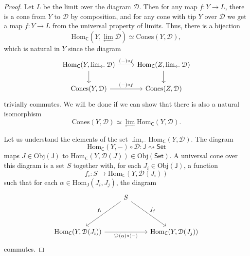 \documentclass[a4paper,10pt]{scrreprt}
\newcommand{\Obj}{\mathrm{Obj}}
\newcommand{\Hom}{\mathrm{Hom}}
\theoremstyle{definition}
\theoremstyle{plain}
\theoremstyle{remark}
\begin{document}
\begin{proof}
  Let $L$ be the limit over the diagram $\mathcal{D}$. Then for any map $f\colon Y \to L$, there is a cone from $Y$ to $\mathcal{D}$ by composition, and for any cone with tip $Y$ over $\mathcal{D}$ we get a map $f\colon Y \to L$ from the universal property of limits. Thus, there is a bijection
  \begin{equation*}
    \Hom_{\mathsf{C}}(Y, \lim_{\leftarrow}\mathcal{D}) \simeq \mathrm{Cones}(Y, \mathcal{D}),
  \end{equation*}
  which is natural in $Y$ since the diagram
  \begin{equation*}
    \begin{tikzcd}
      \Hom_{\mathsf{C}}(Y, \lim_{\leftarrow}\mathcal{D})
      \arrow[r, "(-) \circ f"]
      \arrow[d]
      & \Hom_{\mathsf{C}}(Z, \lim_{\leftarrow}\mathcal{D})
      \arrow[d]
      \\
      \mathrm{Cones}(Y, \mathcal{D})
      \arrow[r, "(-) \circ f"]
      & \mathrm{Cones}(Z, \mathcal{D})
    \end{tikzcd}
  \end{equation*}
  trivially commutes. We will be done if we can show that there is also a natural isomorphism
  \begin{equation*}
    \mathrm{Cones}(Y, \mathcal{D}) \simeq \lim_{\leftarrow} \Hom_{\mathsf{C}}(Y, \mathcal{D}).
  \end{equation*}

  Let us understand the elements of the set $\lim_{\leftarrow}\Hom_{\mathsf{C}}(Y, \mathcal{D})$. The diagram 
  \begin{equation*}
    \Hom_{\mathsf{C}}(Y, -) \circ \mathcal{D} \colon \mathsf{J} \rightsquigarrow \mathsf{Set}
  \end{equation*}
  maps $J \in \Obj(\mathsf{J})$ to $\Hom_{\mathsf{C}}(Y, \mathcal{D}(J)) \in \Obj(\mathsf{Set})$. A universal cone over this diagram is a set $S$ together with, for each $J_{i} \in \Obj(\mathsf{J})$, a function
  \begin{equation*}
    f_{i}\colon S \to \Hom_{\mathsf{C}}(Y, \mathcal{D}(J_{i}))
  \end{equation*}
  such that for each $\alpha \in \Hom_{\mathsf{J}}(J_{i}, J_{j})$, the diagram
  \begin{equation*}
    \begin{tikzcd}[row sep=huge]
      & S
      \arrow[dl, swap, "f_{i}"]
      \arrow[dr, "f_{j}"]
      \\
      \Hom_{\mathsf{C}}(Y, \mathcal{D}(J_{i}))
      \arrow[rr, swap, "\mathcal{D}(\alpha) \circ (-)"]
      & & \Hom_{\mathsf{C}}(Y, \mathcal{D}(J_{j}))
    \end{tikzcd}
  \end{equation*}
  commutes.


\end{proof}
\end{document}
